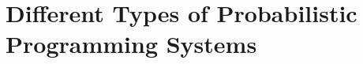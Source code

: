 \documentclass[AERbeamer%
              ,optEnglish%
              ,optBiber%
              ,optBibstyleAlphabetic%
              ,optBeamerClassicFormat%
              ]{AERlatex}%
\begin{document}
\section{Different Types of Probabilistic Programming Systems}







%
%
%
%
\end{document}
